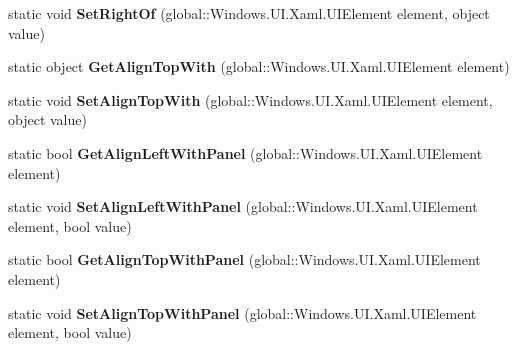 \begin{DoxyCompactItemize}
\item 
\mbox{\label{class_windows_1_1_u_i_1_1_xaml_1_1_controls_1_1_relative_panel_a9559e4960630a4b153111ba23f0e51a0}} 
static void {\bfseries Set\+Right\+Of} (global\+::\+Windows.\+U\+I.\+Xaml.\+U\+I\+Element element, object value)
\item 
\mbox{\label{class_windows_1_1_u_i_1_1_xaml_1_1_controls_1_1_relative_panel_a26c367e9f2c099f097099bb693c02c02}} 
static object {\bfseries Get\+Align\+Top\+With} (global\+::\+Windows.\+U\+I.\+Xaml.\+U\+I\+Element element)
\item 
\mbox{\label{class_windows_1_1_u_i_1_1_xaml_1_1_controls_1_1_relative_panel_a6b8a7aa477bd88abf3a2339481e79caa}} 
static void {\bfseries Set\+Align\+Top\+With} (global\+::\+Windows.\+U\+I.\+Xaml.\+U\+I\+Element element, object value)
\item 
\mbox{\label{class_windows_1_1_u_i_1_1_xaml_1_1_controls_1_1_relative_panel_a222a12643fe778467363d2213978054e}} 
static bool {\bfseries Get\+Align\+Left\+With\+Panel} (global\+::\+Windows.\+U\+I.\+Xaml.\+U\+I\+Element element)
\item 
\mbox{\label{class_windows_1_1_u_i_1_1_xaml_1_1_controls_1_1_relative_panel_acf50525353e5484990104e58477683b5}} 
static void {\bfseries Set\+Align\+Left\+With\+Panel} (global\+::\+Windows.\+U\+I.\+Xaml.\+U\+I\+Element element, bool value)
\item 
\mbox{\label{class_windows_1_1_u_i_1_1_xaml_1_1_controls_1_1_relative_panel_a79e2ec081a759fa726ebcde40fc95107}} 
static bool {\bfseries Get\+Align\+Top\+With\+Panel} (global\+::\+Windows.\+U\+I.\+Xaml.\+U\+I\+Element element)
\item 
\mbox{\label{class_windows_1_1_u_i_1_1_xaml_1_1_controls_1_1_relative_panel_a30dbaee90a5c315837eeaf26f417b320}} 
static void {\bfseries Set\+Align\+Top\+With\+Panel} (global\+::\+Windows.\+U\+I.\+Xaml.\+U\+I\+Element element, bool value)

\end{DoxyCompactItemize}
